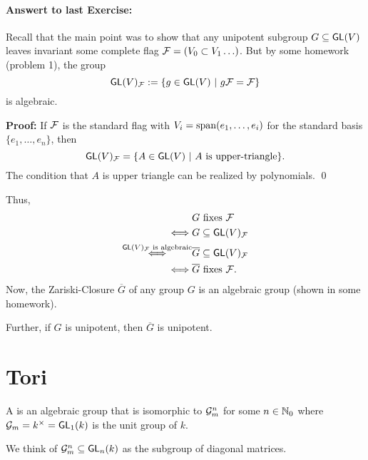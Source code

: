 
\paragraph{Answert to last Exercise:} Recall that the main point was to show that any unipotent subgroup $G \subseteq \textsf{GL}(V)$ leaves invariant some complete flag $\mathcal{F} = (V_0 \subset V_1 \ldots)$. But by some homework (problem 1), the group
\[ \textsf{GL}(V)_{\mathcal{F}} := \left\lbrace g \in \textsf{GL}(V) ~ | ~ g\mathcal{F} = \mathcal{F}\right\rbrace \]
is algebraic.

\textbf{Proof:} If $\mathcal{F}$ is the standard flag with $V_i = \mathrm{span}(e_1, \ldots, e_i)$ for the standard basis $\{e_1, \ldots, e_n\}$, then
\[ \textsf{GL}(V)_{\mathcal{F}} = \{ A \in \textsf{GL}(V) ~|~ A \text{ is upper-triangle} \}. \]
The condition that $A$ is upper triangle can be realized by polynomials. \qed


Thus,
\begin{align*}
& G \text{ fixes }\mathcal{F}\\
\iff & G \subseteq \textsf{GL}(V)_{\mathcal{F}}\\
\overset{\textsf{GL}(V)_{\mathcal{F}} \text{ is algebraic}}{\iff}& \overline{G} \subseteq\textsf{GL}(V)_{\mathcal{F}}\\
\iff & \overline{G} \text{ fixes } \mathcal{F}.
\end{align*}
Now, the Zariski-Closure $\overline{G}$ of any group $G$ is an algebraic group (shown in some homework).

Further, if $G$ is unipotent, then $\overline{G}$ is unipotent.


\section{Tori}
\begin{definition}
A  is an algebraic group that is isomorphic to $\mathcal{G}_m^n$ for some $n \in \mathbb{N}_0$ where $\mathcal{G}_m = k^\times = \textsf{GL}_1(k)$ is the unit group of $k$.

We think of $\mathcal{G}_m^n \subseteq \textsf{GL}_n(k)$ as the subgroup of diagonal matrices.
\end{definition}

